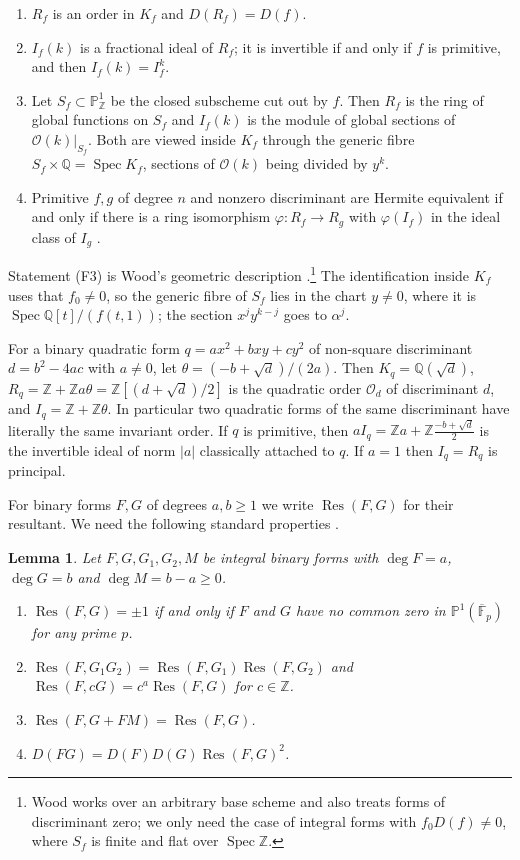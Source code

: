 \documentclass[11pt]{amsart}
\newtheorem{lemma}[theorem]{Lemma}
\theoremstyle{definition}
\newcommand{\ZZ}{\mathbb{Z}}
\newcommand{\QQ}{\mathbb{Q}}
\newcommand{\FF}{\mathbb{F}}
\newcommand{\PP}{\mathbb{P}}
\newcommand{\OO}{\mathcal{O}}
\DeclareMathOperator{\Res}{Res}
\DeclareMathOperator{\Spec}{Spec}
\begin{document}
\begin{enumerate}
\item[(F1)] $R_f$ is an order in $K_f$ and $D(R_f)=D(f)$.
\item[(F2)] $I_f(k)$ is a fractional ideal of $R_f$; it is invertible if and only if $f$ is primitive, and then $I_f(k)=I_f^k$.
\item[(F3)] Let $S_f\subset\PP^1_\ZZ$ be the closed subscheme cut out by $f$. Then $R_f$ is the ring of global functions on $S_f$ and $I_f(k)$ is the module of global sections of $\OO(k)|_{S_f}$. Both are viewed inside $K_f$ through the generic fibre $S_f\times\QQ=\Spec K_f$, sections of $\OO(k)$ being divided by $y^k$.
\item[(F4)] Primitive $f,g$ of degree $n$ and nonzero discriminant are Hermite equivalent if and only if there is a ring isomorphism $\varphi\colon R_f\to R_g$ with $\varphi(I_f)$ in the ideal class of $I_g$ \cite[Corollary~3.12]{BEGRS23}.
\end{enumerate}

Statement (F3) is Wood's geometric description \cite[\S2 and Appendix~A]{Woo11}.\footnote{Wood works over an arbitrary base scheme and also treats forms of discriminant zero; we only need the case of integral forms with $f_0D(f)\neq0$, where $S_f$ is finite and flat over $\Spec\ZZ$.} The identification inside $K_f$ uses that $f_0\neq0$, so the generic fibre of $S_f$ lies in the chart $y\neq0$, where it is $\Spec\QQ[t]/(f(t,1))$; the section $x^jy^{k-j}$ goes to $\alpha^j$.

For a binary quadratic form $q=ax^2+bxy+cy^2$ of non-square discriminant $d=b^2-4ac$ with $a\neq0$, let $\theta=(-b+\sqrt d)/(2a)$. Then $K_q=\QQ(\sqrt d)$, $R_q=\ZZ+\ZZ a\theta=\ZZ[(d+\sqrt d)/2]$ is the quadratic order $\OO_d$ of discriminant $d$, and $I_q=\ZZ+\ZZ\theta$. In particular two quadratic forms of the same discriminant have literally the same invariant order. If $q$ is primitive, then $aI_q=\ZZ a+\ZZ\tfrac{-b+\sqrt d}{2}$ is the invertible ideal of norm $|a|$ classically attached to $q$. If $a=1$ then $I_q=R_q$ is principal.

For binary forms $F,G$ of degrees $a,b\ge1$ we write $\Res(F,G)$ for their resultant. We need the following standard properties \cite[Chapter~IV, \S8 and Chapter~IX, \S3]{Lan02}.

\begin{lemma}\label{lem:res}
Let $F,G,G_1,G_2,M$ be integral binary forms with $\deg F=a$, $\deg G=b$ and $\deg M=b-a\ge0$.
\begin{enumerate}
\item $\Res(F,G)=\pm1$ if and only if $F$ and $G$ have no common zero in $\PP^1(\overline{\FF}_p)$ for any prime $p$.
\item $\Res(F,G_1G_2)=\Res(F,G_1)\Res(F,G_2)$ and $\Res(F,cG)=c^a\Res(F,G)$ for $c\in\ZZ$.
\item $\Res(F,G+FM)=\Res(F,G)$.
\item $D(FG)=D(F)D(G)\Res(F,G)^2$.
\end{enumerate}
\end{lemma}
\end{document}
